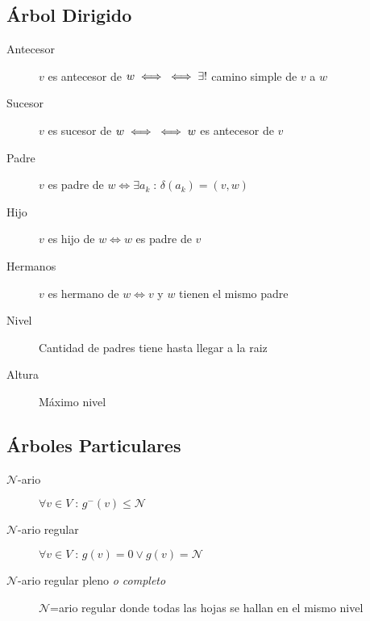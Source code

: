\documentclass[a4paper,twocolumn]{article}
\numberwithin{equation}{section}
\numberwithin{figure}{section}
\numberwithin{table}{section}
\newcommand{\refa}[1]{}
\newcommand{\talque}{\;:\,} %
\begin{document}
\subsection{\'Arbol Dirigido}
\begin{description}
    \item[Antecesor] $v$ es antecesor de $w \iff \\ \iff \exists ! $ camino simple\refa{camino simple} de $v$ a $w$
    \item[Sucesor] $v$ es sucesor de $w \iff \\ \iff w$ es antecesor de $v$
    \item[Padre] $v$ es padre de $w \iff \exists a_k \talque \delta(a_k) = (v, w)$
    \item[Hijo] $v$ es hijo de $w \iff w$ es padre de $v$
    \item[Hermanos] $v$ es hermano de $w \iff v$ y $w$ tienen el mismo padre
    \item[Nivel] Cantidad de padres tiene hasta llegar a la raiz
    \item[Altura] M\'aximo nivel
\end{description}

\subsection{\'Arboles Particulares}
\begin{description}
    \item[$\mathcal{N}$-ario] $\forall v \in V \talque g^-(v) \leq \mathcal{N}$
    \item[$\mathcal{N}$-ario regular] $\forall v \in V \talque g(v)=0 \lor g(v)=\mathcal{N}$
    \item[$\mathcal{N}$-ario regular pleno \emph{o completo}] $\mathcal{N}$=ario regular donde  todas las hojas se hallan en el mismo nivel
\end{description}
\end{document}
